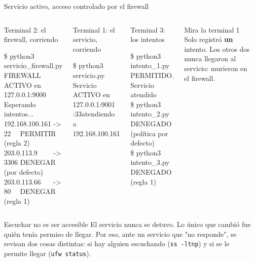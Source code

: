 \documentclass[aspectratio=169,10pt,c]{beamer}
\begin{document}
\begin{frame}{Servicio activo, acceso controlado por el firewall}
\begin{columns}[T,onlytextwidth]
\begin{exampleblock}{Terminal 2: el firewall, corriendo}
\begin{terminal}\scriptsize
\$ python3 servicio\_firewall.py\\
FIREWALL ACTIVO en 127.0.0.1:9000\\
Esperando intentos...\\
192.168.100.161 \phantom{0}-> 22~~ PERMITIR (regla 2)\\
203.0.113.9~~~~ \phantom{0}-> 3306 DENEGAR~ (por defecto)\\
203.0.113.66~~~ \phantom{0}-> 80~~ DENEGAR~ (regla 1)
\end{terminal}
\end{exampleblock}
\begin{exampleblock}{Terminal 1: el servicio, corriendo}
\begin{terminal}\scriptsize
\$ python3 servicio.py\\
Servicio ACTIVO en 127.0.0.1:9001\\
:33\rbrack atendiendo a 192.168.100.161
\end{terminal}
\end{exampleblock}
\begin{exampleblock}{Terminal 3: los intentos}
\begin{terminal}\scriptsize
\$ python3 intento\_1.py\\
PERMITIDO. Servicio atendido\\
\$ python3 intento\_2.py\\
DENEGADO (política por defecto)\\
\$ python3 intento\_3.py\\
DENEGADO (regla 1)
\end{terminal}
\end{exampleblock}
\begin{alertblock}{Mira la terminal 1}
\small Solo registró \textbf{un} intento. Los otros dos nunca llegaron al servicio: murieron en el firewall.
\end{alertblock}
\end{columns}
\begin{block}{Escuchar no es ser accesible}
\footnotesize El servicio nunca se detuvo. Lo único que cambió fue quién tenía permiso de llegar. Por eso, ante un servicio que "no responde", se revisan dos cosas distintas: si hay alguien escuchando (\texttt{ss -ltnp}) y si se le permite llegar (\texttt{ufw status}).
\end{block}
\end{frame}
\end{document}
